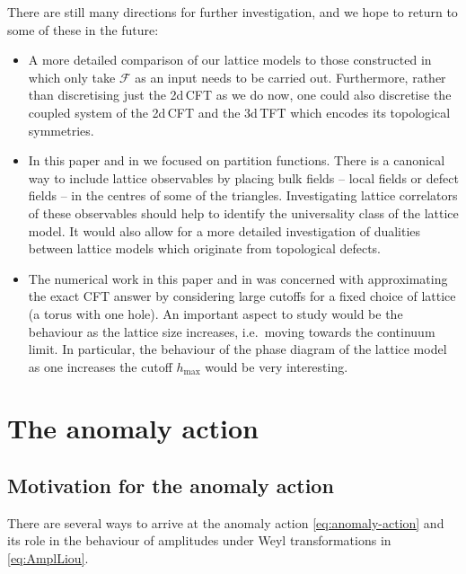 \documentclass[11pt,a4paper]{article}
\numberwithin{equation}{section}
\begin{document}
\smallskip
There are still many directions for further investigation, and we hope to return to some of these in the future:
\begin{itemize}

\item A more detailed comparison of our lattice models to those constructed in \cite{Vanhove:2018wlb,Aasen:2020jwb,Lootens:2020mso} which only take $\mathcal{F}$ as an input needs to be carried out. Furthermore, rather than discretising just the 2d\,CFT as we do now, one could also discretise the coupled system of the 2d\,CFT and the 3d\,TFT which encodes its topological symmetries. 

\item In this paper and in \cite{Brehm:2021wev} we focused on partition functions. There is a canonical way to include lattice observables by placing bulk fields -- local fields or defect fields -- in the centres of some of the triangles. Investigating lattice correlators of these observables should help to identify the universality class of the lattice model. It would also allow for a more detailed investigation of dualities between lattice models which originate from topological defects.

\item The numerical work in this paper and in \cite{Brehm:2021wev} was concerned with approximating the exact CFT answer by considering large cutoffs for a fixed choice of lattice (a torus with one hole). An important aspect to study would be the behaviour as the lattice size increases, i.e.\ moving towards the continuum limit. In particular, the behaviour of the phase diagram of the lattice model as one increases the cutoff $h_\text{max}$ would be very interesting.

 \end{itemize}

 \newpage

\appendix

\section{The anomaly action}\label{app:AnomalyAction}

\subsection{Motivation for the anomaly action}\label{app:LiouvilleMotivation}

There are several ways to arrive at the anomaly action \eqref{eq:anomaly-action} and its role in the behaviour of amplitudes under Weyl transformations in \eqref{eq:AmplLiou}. 
\end{document}
